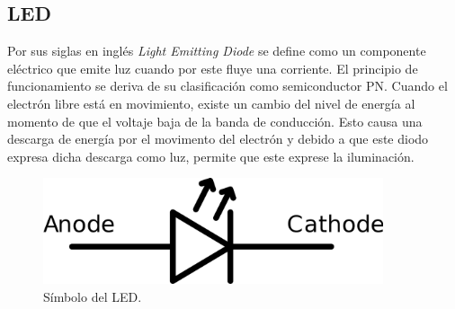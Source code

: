 \documentclass[letterpaper, 12pt]{article}
\begin{document}
    \subsection{LED}
    \justify
    Por sus siglas en inglés \emph{Light Emitting Diode} se define como un componente eléctrico que emite luz cuando por este fluye una corriente. El principio de funcionamiento se deriva de su clasificación como
    semiconductor PN. Cuando el electrón libre está en movimiento, existe un cambio del nivel de energía al momento de que el voltaje baja de la banda de conducción. Esto causa una descarga de energía por el movimento del electrón y debido
    a que este diodo expresa dicha descarga como luz, permite que este exprese la iluminación.
    \begin{figure}[H]
        \centering
        \includegraphics[width=10cm]{LED.png}
        \caption{Símbolo del LED.}
    \end{figure}
\end{document}
